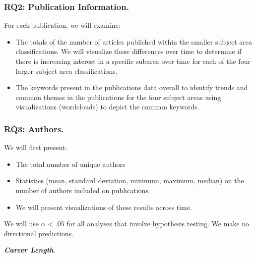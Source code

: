 \documentclass[
  man]{apa7}
\providecommand{\tightlist}{%
  \setlength{\itemsep}{0pt}\setlength{\parskip}{0pt}}
\begin{document}
\hypertarget{rq2-publication-information.-1}{%
\subsubsection{RQ2: Publication Information.}\label{rq2-publication-information.-1}}

For each publication, we will examine:

\begin{itemize}
\tightlist
\item
  The totals of the number of articles published within the smaller
  subject area classifications. We will visualize these differences
  over time to determine if there is increasing interest in a specific
  subarea over time for each of the four larger subject area
  classifications.
\item
  The keywords present in the publications data overall to identify
  trends and common themes in the publications for the four subject
  areas using visualizations (wordclouds) to depict the common
  keywords.
\end{itemize}

\hypertarget{rq3-authors.}{%
\subsubsection{RQ3: Authors.}\label{rq3-authors.}}

We will first present:

\begin{itemize}
\tightlist
\item
  The total number of unique authors
\item
  Statistics (mean, standard deviation, minimum, maximum, median) on
  the number of authors included on publications.
\item
  We will present visualizations of these results across time.
\end{itemize}

We will use \(\alpha\) \textless{} .05 for all analyses that involve hypothesis
testing. We make no directional predictions.

\textbf{\emph{Career Length}}.
\end{document}
